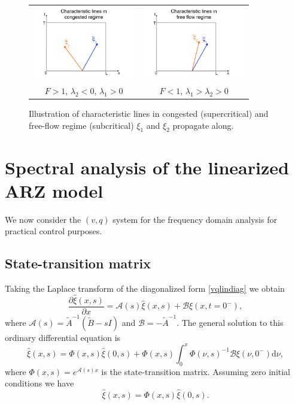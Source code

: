 \documentclass[5p,twocolumn]{elsarticle}
\begin{document}
\begin{figure}
\begin{centering}
\begin{tabular}{cc}
\includegraphics[width=4.5cm]{Congested-regime} & \includegraphics[width=4.5cm]{Free-flow-regime}\tabularnewline
$F>1$, $\lambda_{2}<0$, $\lambda_{1}>0$ & $F<1$, $\lambda_{1}>\lambda_{2}>0$\tabularnewline
\end{tabular}
\par\end{centering}
\protect\caption{Illustration of characteristic lines in congested (supercritical) and free-flow regime (subcritical) $\xi_1$ and $\xi_2$ propagate along.\label{Characteristics}}
\end{figure}


\section{Spectral analysis of the linearized ARZ model}
We now consider the $(v,q)$ system for the frequency domain analysis for practical control purposes.
\subsection{State-transition matrix}
Taking the Laplace transform of the diagonalized form \eqref{vqlindiag} we obtain 
\begin{equation}
\dfrac{\partial \hat{\xi} (x,s)}{\partial x} = \mathscr{A}(s)\hat{\xi}(x,s) + \mathscr{B}\xi(x,t=0^-),
\end{equation}
where $\mathscr{A}(s) = \tilde{A}^{-1}(\tilde{B} - sI)$ and $\mathscr{B} = -\tilde{A}^{-1}$. 
The general solution to this ordinary differential equation is 
\begin{equation}
\hat{\xi}(x,s) = \Phi(x,s)\hat{\xi}(0,s) +  \Phi(x,s) \int^x_0 \Phi(\nu,s)^{-1} \mathscr{B} \xi(\nu,0^-)\text{d} \nu,
\end{equation}
where $\Phi(x,s) = e^{\mathscr{A}(s)x}$ is the state-transition matrix. Assuming zero initial conditions we have 
\begin{equation} \label{TFRiemann}
\hat{\xi}(x,s) = \Phi(x,s)\hat{\xi}(0,s).
\end{equation}
\end{document}
